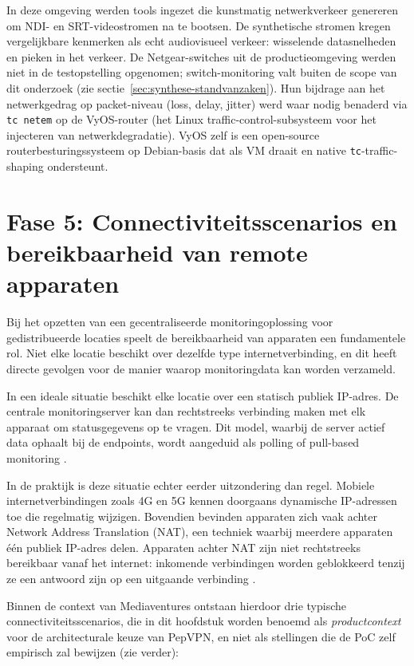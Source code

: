 In deze omgeving werden tools ingezet die kunstmatig netwerkverkeer genereren om NDI- en SRT-videostromen na te bootsen. De synthetische stromen kregen vergelijkbare kenmerken als echt audiovisueel verkeer: wisselende datasnelheden en pieken in het verkeer. De Netgear-switches uit de productieomgeving werden niet in de testopstelling opgenomen; switch-monitoring valt buiten de scope van dit onderzoek (zie sectie~\ref{sec:synthese-standvanzaken}). Hun bijdrage aan het netwerkgedrag op packet-niveau (loss, delay, jitter) werd waar nodig benaderd via \texttt{tc~netem} op de VyOS-router (het Linux traffic-control-subsysteem voor het injecteren van netwerkdegradatie). VyOS zelf is een open-source routerbesturingssysteem op Debian-basis dat als VM draait en native \texttt{tc}-traffic-shaping ondersteunt.

\section{Fase 5: Connectiviteitsscenarios en bereikbaarheid van remote apparaten}
\label{sec:fase5}

Bij het opzetten van een gecentraliseerde monitoringoplossing voor gedistribueerde locaties speelt de bereikbaarheid van apparaten een fundamentele rol. Niet elke locatie beschikt over dezelfde type internetverbinding, en dit heeft directe gevolgen voor de manier waarop monitoringdata kan worden verzameld.

In een ideale situatie beschikt elke locatie over een statisch publiek IP-adres. De centrale monitoringserver kan dan rechtstreeks verbinding maken met elk apparaat om statusgegevens op te vragen. Dit model, waarbij de server actief data ophaalt bij de endpoints, wordt aangeduid als polling of pull-based monitoring \autocite{Ligus2012}.

In de praktijk is deze situatie echter eerder uitzondering dan regel. Mobiele internetverbindingen zoals 4G en 5G kennen doorgaans dynamische IP-adressen toe die regelmatig wijzigen. Bovendien bevinden apparaten zich vaak achter Network Address Translation (NAT), een techniek waarbij meerdere apparaten één publiek IP-adres delen. Apparaten achter NAT zijn niet rechtstreeks bereikbaar vanaf het internet: inkomende verbindingen worden geblokkeerd tenzij ze een antwoord zijn op een uitgaande verbinding \autocite{Srisuresh1999}.

Binnen de context van Mediaventures ontstaan hierdoor drie typische connectiviteitsscenarios, die in dit hoofdstuk worden benoemd als \emph{productcontext} voor de architecturale keuze van PepVPN, en niet als stellingen die de PoC zelf empirisch zal bewijzen (zie verder):

